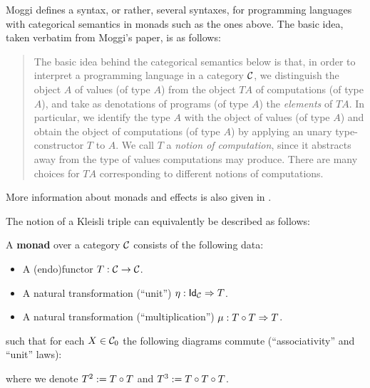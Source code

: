 \begin{reading*}
  Moggi \cite{DBLP:journals/iandc/Moggi91} defines a syntax, or rather, several syntaxes, for programming languages with categorical semantics in monads such as the ones above.
  The basic idea, taken verbatim from Moggi's paper, is as follows:
  \begin{quote}
    The basic idea behind the categorical semantics below is that, in order to interpret a programming language in a category $\CC$, we distinguish the object $A$ of values (of type $A$) from the object $T A$ of computations (of type $A$), and take as denotations of programs (of type $A$) the \emph{elements} of $T A$.
In particular, we identify the type $A$ with the object of values (of type $A$) and obtain the object
of computations (of type $A$) by applying an unary type-constructor $T$ to $A$. We call $T$ a \emph{notion of computation}, since it abstracts away from the type of values computations may produce. There are many choices for $T A$ corresponding to different notions of computations.
  \end{quote}

  More information about monads and effects is also given in \cite{DBLP:conf/ac/BentonHM00}.
\end{reading*}



The notion of a Kleisli triple can equivalently be described  as follows:
\begin{dfn}\label{def:monad}
A \textbf{monad} over a category $\CC$ consists of the following data:
\begin{itemize}
\item A (endo)functor $T:\CC\to\CC$.
\item A natural transformation (``unit'') $\NatTrans{\eta}{\Id[\CC]}{T}$.
\item A natural transformation (``multiplication'') $\NatTrans{\mu}{\co{T}{T}}{T}$.
\end{itemize}
such that for each $X\in\Ob{\CC}$ the following diagrams commute (``associativity'' and ``unit'' laws):
\begin{center}
\quad
{}

\end{center}
where we denote $T^2 := \co{T}{T}$ and $T^3 := \co{T}{\co{T}{T}}$.
\end{dfn}

